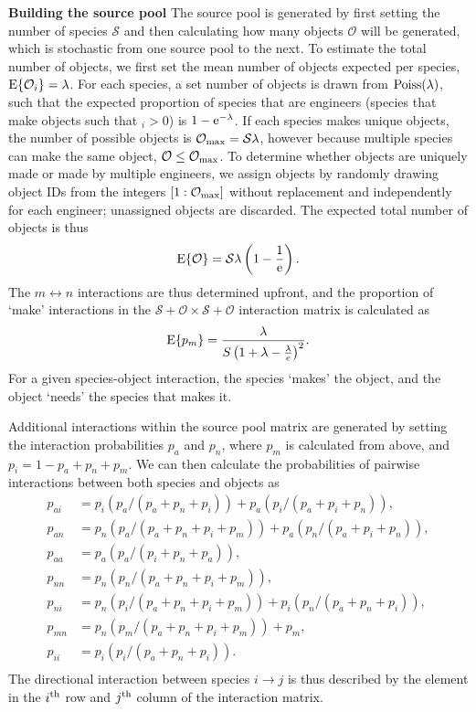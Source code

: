 \documentclass[twocolumn,preprintnumbers,amsmath,amssymb,superscriptaddress]{revtex4}
\begin{document}
\textbf{Building the source pool} The source pool is generated by first setting the number of species $\mathcal{S}$ and then calculating how many objects $\mathcal{O}$ will be generated, which is stochastic from one source pool to the next.
To estimate the total number of objects, we first set the mean number of objects expected per species, ${\rm E}\{\mathcal{O}_i\}=\lambda$.
For each species, a set number of objects is drawn from ${\rm Poiss}(\lambda)$, such that the expected proportion of species that are engineers (species that make objects such that $\mathcal{}_i > 0$) is $1-{\rm e}^{-\lambda}$. 
If each species makes unique objects, the number of possible objects is $\mathcal{O}_{\rm max} = \mathcal{S}\lambda$, however because multiple species can make the same object, $\mathcal{O} \leq \mathcal{O}_{\rm max}$.
To determine whether objects are uniquely made or made by multiple engineers, we assign objects by randomly drawing object IDs from the integers $[1:\mathcal{O}_{\rm max}]$ without replacement and independently for each engineer; unassigned objects are discarded.
The expected total number of objects is thus 
\begin{equation}
{\rm E}\{\mathcal{O}\} = \mathcal{S}\lambda\left(1 - \frac{1}{{\rm e}}\right).
\end{equation}
The $m \leftrightarrow n$ interactions are thus determined upfront, and the proportion of `make' interactions in the $\mathcal{S} + \mathcal{O} \times \mathcal{S} + \mathcal{O}$ interaction matrix is calculated as
\begin{equation}
{\rm E}\{p_m\} = \frac{\lambda}{S\left(1 + \lambda - \frac{\lambda}{e}\right)^2}.
\end{equation}
For a given species-object interaction, the species `makes' the object, and the object `needs' the species that makes it.



Additional interactions within the source pool matrix are generated by setting the interaction probabilities $p_a$ and $p_n$, where $p_m$ is calculated from above, and $p_i = 1 - p_a + p_n + p_m$. 
We can then calculate the probabilities of pairwise interactions between both species and objects as 
\begin{align}
  p_{ai} &= p_i(p_a/(p_a+p_n+p_i)) + p_a(p_i/(p_a+p_i+p_n)), \\ \nonumber
  p_{an} &= p_n(p_a/(p_a+p_n+p_i+p_m)) + p_a(p_n/(p_a+p_i+p_n)), \\ \nonumber
  p_{aa} &= p_a(p_a/(p_i+p_n+p_a)), \\ \nonumber
  p_{nn} &= p_n(p_n/(p_a+p_n+p_i+p_m)), \\ \nonumber
  p_{ni} &= p_n(p_i/(p_a+p_n+p_i+p_m)) + p_i(p_n/(p_a+p_n+p_i)), \\ \nonumber
  p_{mn} &= p_n(p_m/(p_a+p_n+p_i+p_m)) + p_m, \\ \nonumber
  p_{ii} &= p_i(p_i/(p_a+p_n+p_i)).\\ \nonumber
\end{align}
The directional interaction between species $i \rightarrow j$ is thus described by the element in the $i^{\rm th}$ row and $j^{\rm th}$ column of the interaction matrix.
\end{document}
